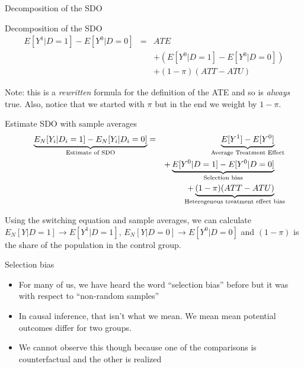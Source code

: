 \documentclass{beamer}
\begin{document}
\begin{frame}{Decomposition of the SDO}

  \begin{block}{Decomposition of the SDO}
    \begin{eqnarray*}
      E[Y^1 | D=1] - E[Y^0 | D=0]  &=& ATE \\
      &&+ (E[Y^0|D=1] - E[Y^0|D=0])  \\
      && + (1-\pi)(ATT - ATU)
    \end{eqnarray*}
  \end{block}
  
  \bigskip
  
  Note: this is a \emph{rewritten} formula for the definition of the ATE and so is \emph{always} true.  Also, notice that we started with $\pi$ but in the end we weight by $1-\pi$.
\end{frame}


\begin{frame}[plain]

  \begin{block}{Estimate SDO with sample averages}
    \begin{eqnarray*}
      \underbrace{E_N[Y_i | D_i=1] - E_N[Y_i | D_i=0]}_{ \mathclap{\text{Estimate of SDO}}}&=& \underbrace{E[Y^1] - E[Y^0]}_{ \mathclap{\text{Average Treatment Effect}}} \\
      &&+ \underbrace{E[Y^0|D=1] - E[Y^0 | D=0]}_{ \mathclap{\text{Selection bias}}}  \\
      && + \underbrace{(1-\pi)(ATT - ATU)}_{ \mathclap{\text{Heterogenous treatment effect bias}}}
    \end{eqnarray*}
  \end{block}

\bigskip

    Using the switching equation and sample averages, we can calculate $E_N[Y|D=1] \to E[Y^1 | D=1]$, $E_N[Y|D=0] \to E[Y^0|D=0]$ and $(1-\pi)$ is the share of the population in the control group.

\end{frame}


\begin{frame}{Selection bias}

\begin{itemize}
\item For many of us, we have heard the word ``selection bias'' before but it was with respect to ``non-random samples''
\item In causal inference, that isn't what we mean.  We mean mean potential outcomes differ for two groups.
\item We cannot observe this though because one of the comparisons is counterfactual and the other is realized
\end{itemize}

\end{frame}
\end{document}
